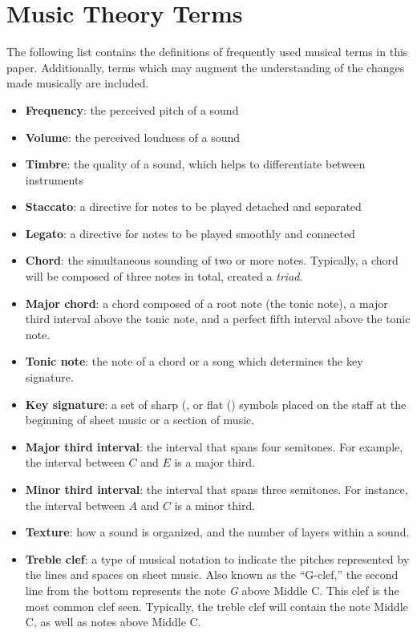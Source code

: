 \chapter{Music Theory Terms}\label{appendix:music-theory-terms}
The following list contains the definitions of frequently used musical terms in this paper. Additionally, terms which may augment the understanding of the changes made musically are included. 
\begin{itemize}
    \item {\textbf{Frequency}: the perceived pitch of a sound}
    \item {\textbf{Volume}: the perceived loudness of a sound}
    \item {\textbf{Timbre}: the quality of a sound, which helps to differentiate between instruments}
    \item {\textbf{Staccato}: a directive for notes to be played detached and separated}
    \item {\textbf{Legato}: a directive for notes to be played smoothly and connected}
    \item {\textbf{Chord}: the simultaneous sounding of two or more notes. Typically, a chord will be composed of three notes in total, created a \textit{triad}.}
    \item {\textbf{Major chord}: a chord composed of a root note (the tonic note), a major third interval above the tonic note, and a perfect fifth interval above the tonic note.}
    \item {\textbf{Tonic note}: the note of a chord or a song which determines the key signature.}
    \item {\textbf{Key signature}: a set of sharp (\musSharp{}, or flat (\musFlat{}) symbols placed on the staff at the beginning of sheet music or a section of music.}
    \item {\textbf{Major third interval}: the interval that spans four semitones. For example, the interval between $C$ and $E$ is a major third.}
    \item {\textbf{Minor third interval}: the interval that spans three semitones. For instance, the interval between $A$ and $C$ is a minor third.}
    \item {\textbf{Texture}: how a sound is organized, and the number of layers within a sound.}
    \item {\textbf{Treble clef}: a type of musical notation to indicate the pitches represented by the lines and spaces on sheet music. Also known as the ``G-clef,'' the second line from the bottom represents the note \textit{G} above Middle C. This clef is the most common clef seen. Typically, the treble clef will contain the note Middle C, as well as notes above Middle C.}

\end{itemize}
